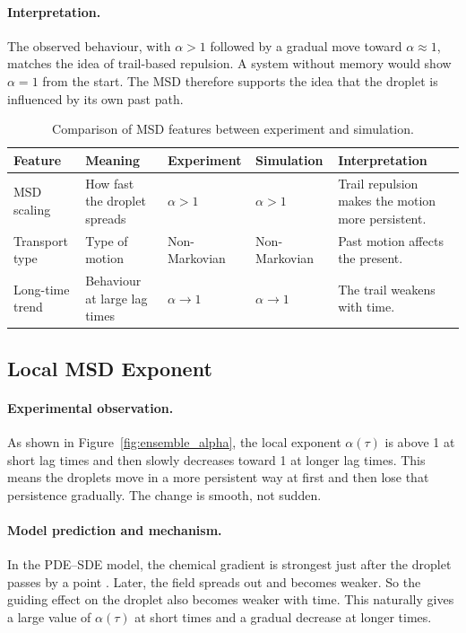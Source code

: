 \paragraph{Interpretation.}
The observed behaviour, with $\alpha > 1$ followed by a gradual move toward $\alpha \approx 1$, matches the idea of trail-based repulsion. A system without memory would show $\alpha = 1$ from the start. The MSD therefore supports the idea that the droplet is influenced by its own past path.

\begin{table}[htbp]
\centering
\caption{Comparison of MSD features between experiment and simulation.}
\label{tab:msd_comparison}
\renewcommand{\arraystretch}{1.25}
\begin{tabular}{p{2.4cm} p{3.0cm} p{2.3cm} p{2.3cm} p{3.2cm}}
\hline\hline
\textbf{Feature} & \textbf{Meaning} & \textbf{Experiment} & \textbf{Simulation} & \textbf{Interpretation} \\
\hline
MSD scaling & How fast the droplet spreads & $\alpha > 1$ & $\alpha > 1$ & Trail repulsion makes the motion more persistent. \\[4pt]
Transport type & Type of motion & Non-Markovian & Non-Markovian & Past motion affects the present. \\[4pt]
Long-time trend & Behaviour at large lag times & $\alpha \to 1$ & $\alpha \to 1$ & The trail weakens with time. \\
\hline\hline
\end{tabular}
\end{table}

\subsection{Local MSD Exponent}
\label{subsec:comp_local_exponent}

\paragraph{Experimental observation.}
As shown in Figure~\ref{fig:ensemble_alpha}, the local exponent $\alpha(\tau)$ is above 1 at short lag times and then slowly decreases toward 1 at longer lag times. This means the droplets move in a more persistent way at first and then lose that persistence gradually. The change is smooth, not sudden.

\paragraph{Model prediction and mechanism.}
In the PDE--SDE model, the chemical gradient is strongest just after the droplet passes by a point \cite{droplet2025}. Later, the field spreads out and becomes weaker. So the guiding effect on the droplet also becomes weaker with time. This naturally gives a large value of $\alpha(\tau)$ at short times and a gradual decrease at longer times.

